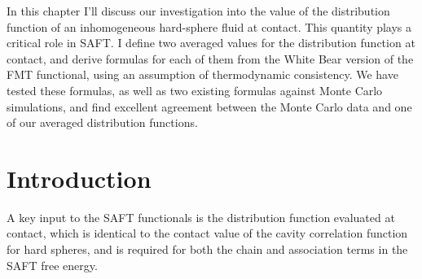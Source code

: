 \newcommand{\red}[1]{{\bf \color{red} #1}}
\newcommand{\blue}[1]{{\bf \color{blue} #1}}
\newcommand{\green}[1]{{\bf \color{green} #1}}
\newcommand{\refnote}{\red{[ref]}}

\newcommand{\derivation}[1]{} %

\newcommand{\needsworklater}[1]{\emph{[#1]}}
\newcommand{\needsworknow}[1]{\textcolor{red}{[\emph{#1}]}}
In this chapter I'll discuss our investigation into the value of the
distribution function of an inhomogeneous hard-sphere fluid at
contact.  This quantity plays a critical role in SAFT.  I define two
averaged values for the distribution function at contact, and derive
formulas for each of them from the White Bear version of the FMT
functional, using an assumption of thermodynamic consistency. We have
tested these formulas, as well as two existing formulas against Monte
Carlo simulations, and find excellent agreement between the Monte
Carlo data and one of our averaged distribution functions.

\section{Introduction}


A key input to the SAFT functionals is the distribution function
evaluated at contact, which is identical to the contact value of the
cavity correlation function for hard spheres, and is required for both
the chain and association terms in the SAFT free energy.

